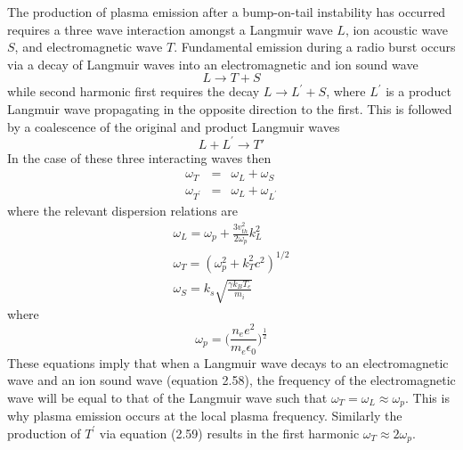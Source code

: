 
The production of plasma emission after a bump-on-tail instability has occurred requires a three wave interaction amongst a Langmuir wave $L$, ion acoustic wave $S$, and electromagnetic wave $T$. Fundamental emission during a radio burst occurs via a decay of Langmuir waves into an electromagnetic and ion sound wave
\begin{equation}
L \rightarrow T + S
\label{eqn:fund}
\end{equation}
while second harmonic first requires the decay $L\rightarrow L^{'} + S$, where $L^{'}$ is a product Langmuir wave propagating in the opposite direction to the first. This is followed by a coalescence of the original and product Langmuir waves
\begin{equation}
L + L^{'}\rightarrow T'
\label{eqn:harm}
\end{equation}
In the case of these three interacting waves then 
\begin{eqnarray}
\omega_T & = & \omega_L + \omega_S \\
\omega_{T^{'}} & = & \omega_L + \omega_{L^{'}}
\end{eqnarray}
where the relevant dispersion relations are 
\begin{eqnarray}
\omega_L = \omega_p + \frac{3v_{th}^2}{2\omega_p}k_L^2 \\
\omega_T = (\omega_p^2 +k_T^2c^2)^{1/2} \\
\omega_S = k_s\sqrt{\frac{\gamma k_B T_e}{m_i}}
\end{eqnarray}
where
\begin{equation}
\omega_p = \bigg(\frac{n_e e^2}{m_e \epsilon_0}\bigg)^\frac{1}{2}
\label{eqn:plasma_frequency}
\end{equation}
These equations imply that when a Langmuir wave decays to an electromagnetic wave and an ion sound wave (equation 2.58), the frequency of the electromagnetic wave will be equal to that of the Langmuir wave such that $\omega_T = \omega_L \approx \omega_p$. This is why plasma emission occurs at the local plasma frequency. Similarly the production of $T^{'}$ via equation (2.59) results in the first harmonic $\omega_T \approx 2\omega_p$. 
%
%

